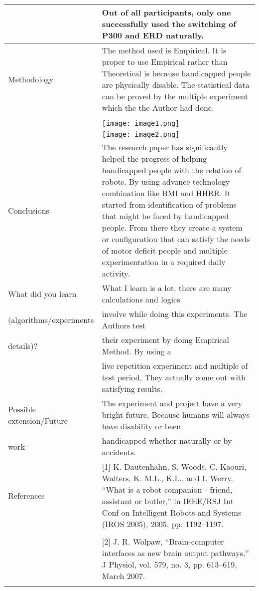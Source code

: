 \documentclass[a4paper, 12pt]{article}
\begin{document}
\begin{tabular}{| m{12em} | m{28em} |}
& Out of all participants, only one successfully used the switching of P300 and ERD 
naturally. \\
\hline

Methodology & 
The method used is Empirical. It is proper to use Empirical rather than Theoretical is because handicapped people are physically disable. The statistical data can be proved by the multiple experiment which the the Author had done. \\
& \\
& \texttt{[image: image1.png]} \\
& \texttt{[image: image2.png]}\\

\hline

Conclusions & 
The research paper has significantly helped the progress of helping handicapped people with the relation of robots. By using advance technology combination like BMI and HHRR. It started from identification of problems that might be faced by handicapped people. From there they create a system or configuration that can satisfy the needs of motor deficit people and multiple experimentation in a required daily activity.   \\

\hline

What did you learn &
What I learn is a lot, there are many calculations and logics \\
(algorithms/experiments & involve while doing this experiments. The Authors test \\
details)? & their experiment by doing Empirical Method. By using a  \\
& live repetition experiment and multiple of test period, They actually come out with satisfying results. \\
Possible extension/Future & The experiment and project have a very bright future. Because humans will always have disability or been  \\
work & handicapped whether naturally or by accidents. \\

\hline

References & [1] K. Dautenhahn, S. Woods, C. Kaouri, Walters, K. M.L., K.L., and
I. Werry, “What is a robot companion - friend, assistant or butler,” in
IEEE/RSJ Int Conf on Intelligent Robots and Systems (IROS 2005),
2005, pp. 1192–1197. \\
&\\ 
& [2] J. R. Wolpaw, “Brain-computer interfaces as new brain output pathways,”
J Physiol, vol. 579, no. 3, pp. 613–619, March 2007. \\
&\\

\hline
\end{tabular}
\end{document}
